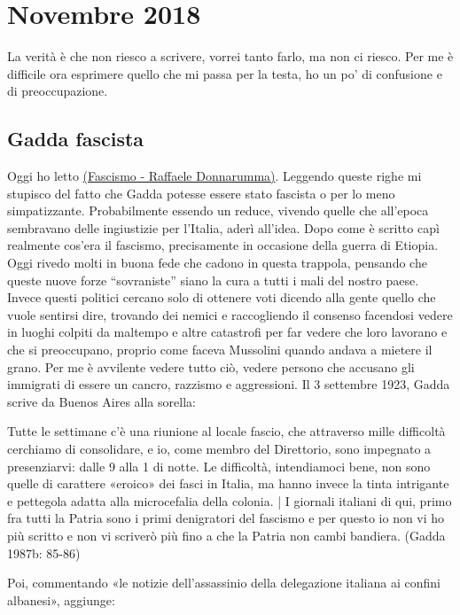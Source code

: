 \section{Novembre 2018}
La verità è che non riesco a scrivere, vorrei tanto farlo, ma non ci riesco. Per me è difficile ora esprimere quello che mi passa per la testa, ho un po' di confusione e di preoccupazione.
\newline

\subsection{Gadda fascista}
Oggi ho letto \href{http://www.gadda.ed.ac.uk/Pages/resources/walks/pge/fascismdonnaru.php}{(Fascismo - Raffaele Donnarumma)}.
Leggendo queste righe mi stupisco del fatto che Gadda potesse essere stato fascista o per lo meno simpatizzante. Probabilmente essendo un reduce, vivendo quelle che all'epoca sembravano delle ingiustizie per l'Italia, aderì all'idea. Dopo come è scritto capì realmente cos'era il fascismo, precisamente in occasione della guerra di Etiopia.\newline
Oggi rivedo molti in buona fede che cadono in questa trappola, pensando che queste nuove forze ``sovraniste'' siano la cura a tutti i mali del nostro paese.
Invece questi politici cercano solo di ottenere voti dicendo alla gente quello che vuole sentirsi dire, trovando dei nemici e raccogliendo il consenso facendosi vedere in luoghi colpiti da maltempo e altre catastrofi per far vedere che loro lavorano e che si preoccupano, proprio come faceva Mussolini quando andava a mietere il grano.
\newline
Per me è avvilente vedere tutto ciò, vedere persono che accusano gli immigrati di essere un cancro, razzismo e aggressioni.
Il 3 settembre 1923, Gadda scrive da Buenos Aires alla sorella:

Tutte le settimane c’è una riunione al locale fascio, che attraverso mille difficoltà cerchiamo di consolidare, e io, come membro del Direttorio, sono impegnato a presenziarvi: dalle 9 alla 1 di notte. Le difficoltà, intendiamoci bene, non sono quelle di carattere «eroico» dei fasci in Italia, ma hanno invece la tinta intrigante e pettegola adatta alla microcefalia della colonia. | I giornali italiani di qui, primo fra tutti la Patria sono i primi denigratori del fascismo e per questo io non vi ho più scritto e non vi scriverò più fino a che la Patria non cambi bandiera. (Gadda 1987b: 85-86)

Poi, commentando «le notizie dell’assassinio della delegazione italiana ai confini albanesi», aggiunge:


